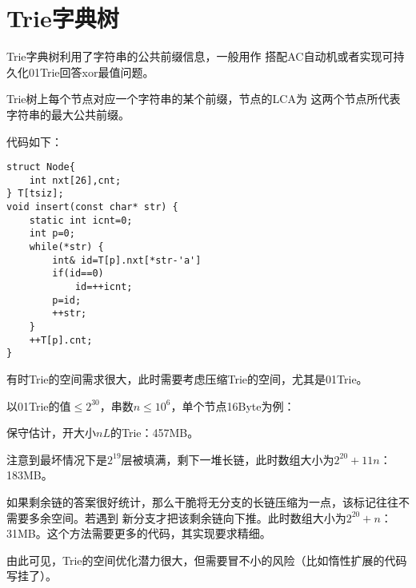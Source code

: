 \section{Trie字典树}
Trie字典树利用了字符串的公共前缀信息，一般用作
搭配AC自动机或者实现可持久化01Trie回答xor最值问题。

Trie树上每个节点对应一个字符串的某个前缀，节点的LCA为
这两个节点所代表字符串的最大公共前缀。

代码如下：
\begin{lstlisting}
struct Node{
    int nxt[26],cnt;
} T[tsiz];
void insert(const char* str) {
    static int icnt=0;
    int p=0;
    while(*str) {
        int& id=T[p].nxt[*str-'a']
        if(id==0)
            id=++icnt;
        p=id;
        ++str;
    }
    ++T[p].cnt;
}
\end{lstlisting}

有时Trie的空间需求很大，此时需要考虑压缩Trie的空间，尤其是01Trie。

以01Trie的值$\leq 2^{30}$，串数$n\leq 10^6$，单个节点16Byte为例：

保守估计，开大小$nL$的Trie：457MB。

注意到最坏情况下是$2^{19}$层被填满，剩下一堆长链，此时数组大小为$2^{20}+11n$：183MB。

如果剩余链的答案很好统计，那么干脆将无分支的长链压缩为一点，该标记往往不需要多余空间。若遇到
新分支才把该剩余链向下推。此时数组大小为$2^{20}+n$：31MB。这个方法需要更多的代码，其实现要求精细。

由此可见，Trie的空间优化潜力很大，但需要冒不小的风险（比如惰性扩展的代码写挂了）。
